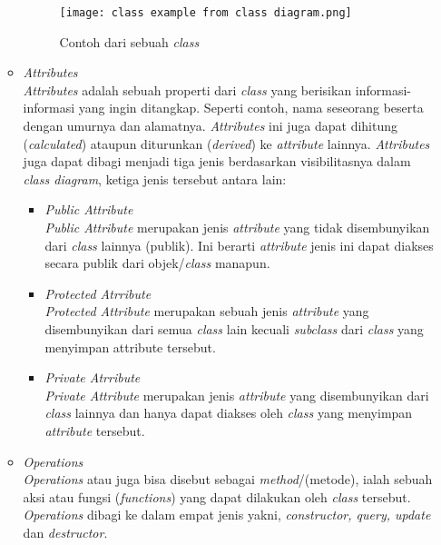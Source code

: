 \documentclass[a4paper]{article}
\begin{document}
\begin{enumerate}
\begin{itemize}
\begin{figure}[h]
            \centering
            \texttt{[image: class example from class diagram.png]}
            \caption{Contoh dari sebuah \textit{class}}
        \end{figure}
        \item \textit{Attributes}\\
        \textit{Attributes} adalah sebuah properti dari \textit{class} yang berisikan informasi-informasi yang ingin ditangkap. Seperti contoh, nama seseorang beserta dengan umurnya dan alamatnya. \textit{Attributes} ini juga dapat dihitung (\textit{calculated}) ataupun diturunkan (\textit{derived}) ke \textit{attribute} lainnya\autocite{systemanalysisdesign-class-diagram}.
        \textit{Attributes} juga dapat dibagi menjadi tiga jenis berdasarkan visibilitasnya dalam \textit{class diagram}, ketiga jenis tersebut antara lain:
        \begin{itemize}
            \item \textit{Public Attribute}\\
            \textit{Public Attribute} merupakan jenis \textit{attribute} yang tidak disembunyikan dari \textit{class} lainnya (publik). Ini berarti \textit{attribute} jenis ini dapat diakses secara publik dari objek/\textit{class} manapun\autocite{systemanalysisdesign-class-diagram}.
            \item \textit{Protected Atrribute}\\
            \textit{Protected Attribute} merupakan sebuah jenis \textit{attribute} yang disembunyikan dari semua \textit{class} lain kecuali \textit{subclass} dari \textit{class} yang menyimpan attribute tersebut\autocite{systemanalysisdesign-class-diagram}.
            \item \textit{Private Atrribute}\\
            \textit{Private Attribute} merupakan jenis \textit{attribute} yang disembunyikan dari \textit{class} lainnya dan hanya dapat diakses oleh \textit{class} yang menyimpan \textit{attribute} tersebut\autocite{systemanalysisdesign-class-diagram}.
        \end{itemize}
        \item \textit{Operations}\\
        \textit{Operations} atau juga bisa disebut sebagai \textit{method}/(metode), ialah sebuah aksi atau fungsi (\textit{functions}) yang dapat dilakukan oleh \textit{class} tersebut. \textit{Operations} dibagi ke dalam empat jenis yakni, \textit{constructor, query, update} dan \textit{destructor}\autocite{systemanalysisdesign-class-diagram}.

\end{itemize}
\end{enumerate}
\end{document}
